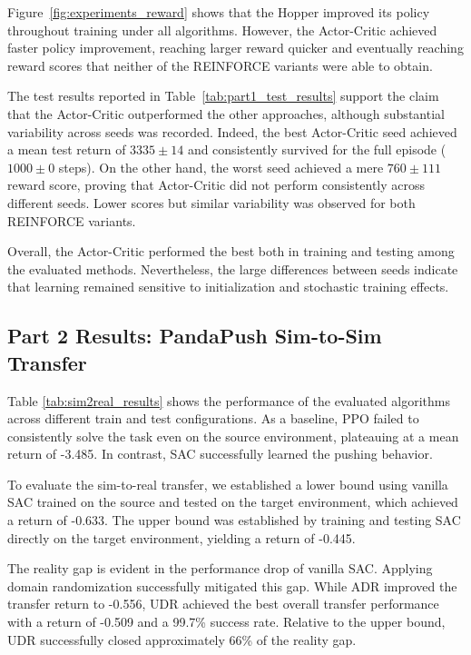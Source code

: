 Figure~\ref{fig:experiments_reward} shows that the Hopper improved its policy throughout training under all algorithms.
However, the Actor-Critic achieved faster policy improvement, reaching larger reward quicker and eventually reaching reward scores that neither of the REINFORCE
variants were able to obtain.

The test results reported in Table~\ref{tab:part1_test_results} support the claim that the Actor-Critic outperformed the other approaches, although substantial variability
across seeds was recorded.
Indeed, the best Actor-Critic seed achieved a mean test return of $3335 \pm 14$ and consistently survived for the full episode ($1000 \pm 0$ steps).
On the other hand, the worst seed achieved a mere $760 \pm 111$ reward score, proving that Actor-Critic did not perform consistently across different seeds.
Lower scores but similar variability was observed for both REINFORCE variants.

Overall, the Actor-Critic performed the best both in training and testing among the evaluated methods.
Nevertheless, the large differences between seeds indicate that learning remained sensitive to initialization and stochastic training effects.












\subsection{Part 2 Results: PandaPush Sim-to-Sim Transfer}
Table \ref{tab:sim2real_results} shows the performance of the evaluated algorithms across different train and test configurations. 
As a baseline, PPO failed to consistently solve the task even on the source environment, plateauing at a mean return of -3.485. In contrast, SAC successfully learned the pushing behavior.

To evaluate the sim-to-real transfer, we established a lower bound using vanilla SAC trained on the source and tested on the target environment, which achieved a return of -0.633. The upper bound was established by training and testing SAC directly on the target environment, yielding a return of -0.445. 

The reality gap is evident in the performance drop of vanilla SAC. Applying domain randomization successfully mitigated this gap. While ADR improved the transfer return to -0.556, UDR achieved the best overall transfer performance with a return of -0.509 and a 99.7\% success rate. Relative to the upper bound, UDR successfully closed approximately 66\% of the reality gap.

